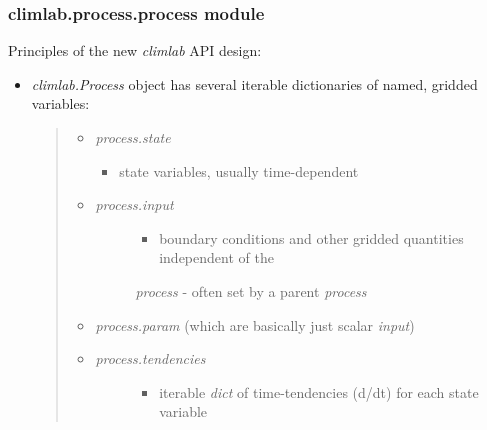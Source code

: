 \documentclass[letterpaper,10pt,english]{sphinxmanual}
\begin{document}
\subsubsection{climlab.process.process module}
\label{api/climlab.process:climlab-process-process-module}\label{api/climlab.process:module-climlab.process.process}
Principles of the new \emph{climlab} API design:
\begin{itemize}
\item {} 
\emph{climlab.Process} object has several iterable dictionaries of named,
gridded variables:
\begin{quote}
\begin{itemize}
\item {} 
\emph{process.state}
\begin{itemize}
\item {} 
state variables, usually time-dependent

\end{itemize}

\end{itemize}
\begin{itemize}
\item {} \begin{description}
\item[{\emph{process.input}}] \leavevmode\begin{itemize}
\item {} 
boundary conditions and other gridded quantities independent of the

\end{itemize}

\emph{process}
- often set by a parent \emph{process}

\end{description}

\item {} 
\emph{process.param}  (which are basically just scalar \emph{input})

\item {} \begin{description}
\item[{\emph{process.tendencies}}] \leavevmode\begin{itemize}
\item {} 
iterable \emph{dict} of time-tendencies (d/dt) for each state variable

\end{itemize}

\end{description}


\end{itemize}
\end{quote}
\end{itemize}
\end{document}
